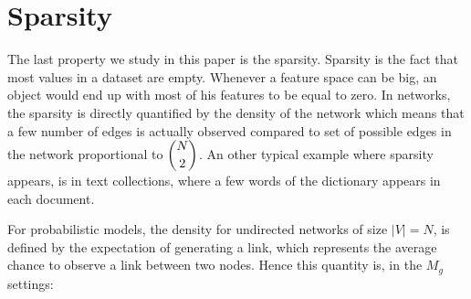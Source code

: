 \section{Sparsity}
\label{sec:sparsity}

The last property we study in this paper is the sparsity. Sparsity is the fact that most values in a dataset are empty. Whenever a feature space can be big, an object would end up with most of his features to be equal to zero. In networks, the sparsity is directly quantified by the density of the network which means that a few number of edges is actually observed compared to set of possible edges in the network proportional to $\dbinom{N}{2}$. An other typical example where sparsity appears, is in text collections, where a few words of the dictionary appears in each document.




For probabilistic models, the density for undirected networks of size $|V|=N$, is defined by the expectation of generating a link, which represents the average chance to observe a link between two nodes. Hence this quantity is, in the $M_g$ settings:


